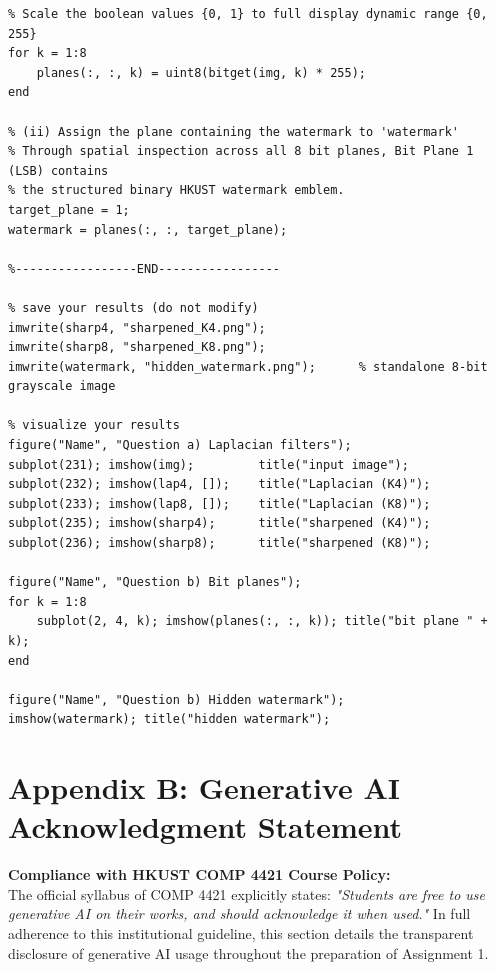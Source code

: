 \documentclass[11pt,a4paper]{article}
\begin{document}
\begin{lstlisting}[caption={Complete and unabridged implementation of \texttt{problem6.m}.}]
% (i) Deconstruct the 8-bit image into 8 binary bit planes
% Scale the boolean values {0, 1} to full display dynamic range {0, 255}
for k = 1:8
    planes(:, :, k) = uint8(bitget(img, k) * 255);
end

% (ii) Assign the plane containing the watermark to 'watermark'
% Through spatial inspection across all 8 bit planes, Bit Plane 1 (LSB) contains
% the structured binary HKUST watermark emblem.
target_plane = 1;
watermark = planes(:, :, target_plane);

%-----------------END-----------------

% save your results (do not modify)
imwrite(sharp4, "sharpened_K4.png");
imwrite(sharp8, "sharpened_K8.png");
imwrite(watermark, "hidden_watermark.png");      % standalone 8-bit grayscale image

% visualize your results
figure("Name", "Question a) Laplacian filters");
subplot(231); imshow(img);         title("input image");
subplot(232); imshow(lap4, []);    title("Laplacian (K4)");
subplot(233); imshow(lap8, []);    title("Laplacian (K8)");
subplot(235); imshow(sharp4);      title("sharpened (K4)");
subplot(236); imshow(sharp8);      title("sharpened (K8)");

figure("Name", "Question b) Bit planes");
for k = 1:8
    subplot(2, 4, k); imshow(planes(:, :, k)); title("bit plane " + k);
end

figure("Name", "Question b) Hidden watermark");
imshow(watermark); title("hidden watermark");
\end{lstlisting}

\newpage
\section{Appendix B: Generative AI Acknowledgment Statement}
\label{sec:ai_acknowledgment}

\noindent\textbf{Compliance with HKUST COMP 4421 Course Policy:}\\
The official syllabus of COMP 4421 explicitly states: \textit{"Students are free to use generative AI on their works, and should acknowledge it when used."} In full adherence to this institutional guideline, this section details the transparent disclosure of generative AI usage throughout the preparation of Assignment 1.
\end{document}
